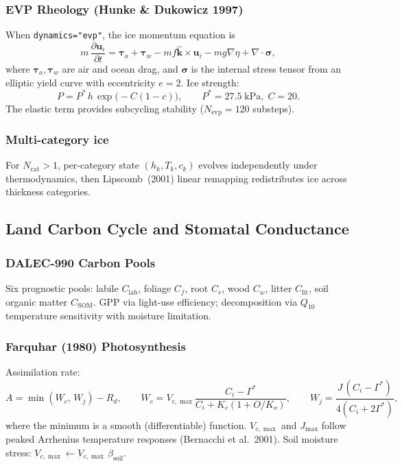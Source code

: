 \documentclass[11pt,a4paper]{article}
\newcommand{\pp}{\partial}
\begin{document}
\subsubsection{EVP Rheology (Hunke \& Dukowicz 1997)}

When \texttt{dynamics="evp"}, the ice momentum equation is
\begin{equation}
  m\,\frac{\pp \bm{u}_i}{\pp t} = \bm{\tau}_a + \bm{\tau}_w - mf\hat{\bm{k}}\times\bm{u}_i - mg\nabla\eta + \nabla\cdot\bm{\sigma},
\end{equation}
where $\bm{\tau}_a,\bm{\tau}_w$ are air and ocean drag, and $\bm{\sigma}$ is the internal stress tensor from an elliptic yield curve with eccentricity $e=2$.  Ice strength:
\begin{equation}
  P = P^*\,h\,\exp\!\big(-C(1-c)\big), \qquad P^*=27.5\;\text{kPa},\; C=20.
\end{equation}
The elastic term provides subcycling stability ($N_{\mathrm{evp}}=120$ substeps).

\subsubsection{Multi-category ice}

For $N_{\mathrm{cat}}>1$, per-category state $(h_k,T_k,c_k)$ evolves independently under thermodynamics, then Lipscomb~(2001) linear remapping redistributes ice across thickness categories.

\subsection{Land Carbon Cycle and Stomatal Conductance}

\subsubsection{DALEC-990 Carbon Pools}
Six prognostic pools: labile $C_{\mathrm{lab}}$, foliage $C_f$, root $C_r$, wood $C_w$, litter $C_{\mathrm{lit}}$, soil organic matter $C_{\mathrm{SOM}}$.  GPP via light-use efficiency; decomposition via $Q_{10}$ temperature sensitivity with moisture limitation.

\subsubsection{Farquhar (1980) Photosynthesis}
Assimilation rate:
\begin{equation}
  A = \min(W_c,\, W_j) - R_d, \qquad
  W_c = V_{c,\max}\frac{C_i - \Gamma^*}{C_i + K_c(1+O/K_o)}, \qquad
  W_j = \frac{J\,(C_i - \Gamma^*)}{4(C_i + 2\Gamma^*)},
\end{equation}
where the minimum is a smooth (differentiable) function.  $V_{c,\max}$ and $J_{\max}$ follow peaked Arrhenius temperature responses (Bernacchi et al.\ 2001).  Soil moisture stress: $V_{c,\max}\leftarrow V_{c,\max}\,\beta_{\mathrm{soil}}$.
\end{document}

